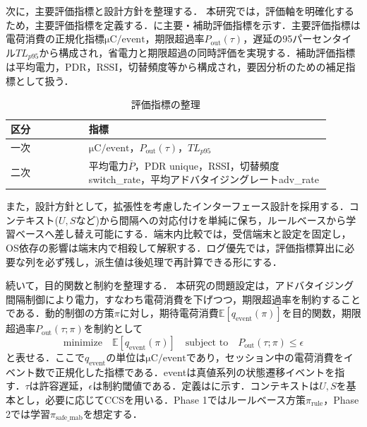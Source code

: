 次に，主要評価指標と設計方針を整理する．
本研究では，評価軸を明確化するため，主要評価指標を定義する．に主要・補助評価指標を示す．主要評価指標は電荷消費の正規化指標$\si{\micro\coulomb}/\text{event}$，期限超過率$P_{\mathrm{out}}(\tau)$，遅延の95パーセンタイル$TL_{p95}$から構成され，省電力と期限超過の同時評価を実現する．補助評価指標は平均電力，PDR，RSSI，切替頻度等から構成され，要因分析のための補足指標として扱う．

\begin{table}[tb]
  \centering
  \caption{評価指標の整理}
  \label{tab:kpi}
  \begin{tabular}{p{0.22\linewidth}p{0.68\linewidth}}
    \toprule
    区分 & 指標 \\
    \midrule
    一次 & $\si{\micro\coulomb}/\text{event}$，$P_{\mathrm{out}}(\tau)$，$TL_{p95}$ \\
    二次 & 平均電力$\overline{P}$，PDR unique，RSSI，切替頻度switch\_rate，平均アドバタイジングレートadv\_rate \\
    \bottomrule
  \end{tabular}
\end{table}

また，設計方針として，拡張性を考慮したインターフェース設計を採用する．コンテキスト($U,S$など)から間隔への対応付けを単純に保ち，ルールベースから学習ベースへ差し替え可能にする．端末内比較では，受信端末と設定を固定し，OS依存の影響は端末内で相殺して解釈する．ログ優先では，評価指標算出に必要な列を必ず残し，派生値は後処理で再計算できる形にする．

続いて，目的関数と制約を整理する．
本研究の問題設定は，アドバタイジング間隔制御により電力，すなわち電荷消費を下げつつ，期限超過率を制約することである．動的制御の方策$\pi$に対し，期待電荷消費$\mathbb{E}[q_{\mathrm{event}}(\pi)]$を目的関数，期限超過率$P_{\mathrm{out}}(\tau;\pi)$を制約として
\begin{equation}
  \text{minimize}\quad \mathbb{E}[q_{\mathrm{event}}(\pi)]
  \quad \text{subject to}\quad P_{\mathrm{out}}(\tau;\pi)\le \epsilon
\end{equation}
と表せる．ここで$q_{\mathrm{event}}$の単位は$\si{\micro\coulomb}/\text{event}$であり，セッション中の電荷消費をイベント数で正規化した指標である．eventは真値系列の状態遷移イベントを指す．$\tau$は許容遅延，$\epsilon$は制約閾値である．定義はに示す．コンテキストは$U,S$を基本とし，必要に応じてCCSを用いる．Phase 1ではルールベース方策$\pi_{\mathrm{rule}}$，Phase 2では学習$\pi_{\mathrm{safe\_mab}}$を想定する．

